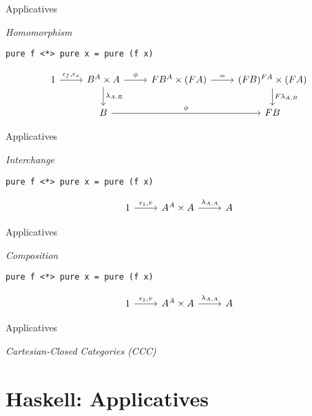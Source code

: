 \documentclass[10pt]{beamer}
\newcommand{\Com}[3]{#3^{#2}}
\theoremstyle{definition}
\theoremstyle{remark}
\numberwithin{equation}{section}
\begin{document}
\begin{frame}[fragile]{Applicatives}

  \emph{Homomorphism}

  \lstinline{pure f <*> pure x = pure (f x)}

  \[
  \begin{tikzcd}
    1 \arrow{r}{\epsilon_f,\epsilon_x} & \Com{C}{A}{B}\times A \arrow{r}{\phi}\arrow{d}{\lambda_{A,B}} &
    F \Com{C}{A}{B} \times (F A) \arrow{r}{=} & \Com{C}{F A}{(F B)} \times (F A) \arrow{d}{F \lambda_{A,B}} \\
    & B \arrow{rr}{\phi} & & F B
  \end{tikzcd}
  \]

\end{frame}

\begin{frame}[fragile]{Applicatives}

  \emph{Interchange}

  \lstinline{pure f <*> pure x = pure (f x)}

  \[
  \begin{tikzcd}
    1 \arrow{r}{\epsilon_1,v} & \Com{C}{A}{A}\times A \arrow{r}{\lambda_{A,A}} & A
  \end{tikzcd}
  \]

\end{frame}

\begin{frame}[fragile]{Applicatives}

  \emph{Composition}

  \lstinline{pure f <*> pure x = pure (f x)}

  \[
  \begin{tikzcd}
    1 \arrow{r}{\epsilon_1,v} & \Com{C}{A}{A}\times A \arrow{r}{\lambda_{A,A}} & A
  \end{tikzcd}
  \]


\end{frame}

\begin{frame}[fragile]{Applicatives}

  \emph{Cartesian-Closed Categories (CCC)}



\end{frame}

\section{Haskell: Applicatives}
\end{document}
